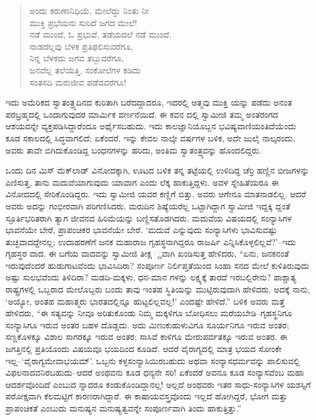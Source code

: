 \begin{verse}
ಅಂದು ಕರುಣಾನಿಧಿಯೆ, ಮೇಲೆದ್ದು ನಿಂತು ನೀ\\ಮುಕ್ತಿ ಪ್ರಭೆಯನು ಸುರಿದೆ ಜಗದ ಮೇಲೆ!\\ನಡೆ ಮುಂದೆ, ಓ ಪ್ರಭುವೆ, ತಡೆಯದಲೆ ನಡೆ ಮುಂದೆ,\\ನಾಡದೆಲ್ಲವು ಬೆಳಕ ಪ್ರತಿಫಲಿಸುವರೆಗೂ,\\ನಿನ್ನ ಬೆಳಕದು ಜಗವ ತಬ್ಬುವರೆಗೂ,\\ಜನವೆಲ್ಲ ತಲೆಯೆತ್ತಿ, ಸಂಕೋಲೆಗಳ ಕಡಿದು\\ಸಂತಸದಿ ಮರುಜೀವ ಪಡೆವವರೆಗೂ!
\end{verse}

ಇದು ಅಮೆರಿಕದ ಸ್ವಾತಂತ್ರ್ಯದಿನದ ಕುರಿತಾಗಿ ಬರೆದದ್ದಾದರೂ, ಇದರಲ್ಲಿ ಆತ್ಮವು ಮುಕ್ತಿ ಯನ್ನು ಪಡೆದು ಅನಂತ ಪರಬ್ರಹ್ಮದಲ್ಲಿ ಒಂದಾಗುವುದರ ಮಾರ್ಮಿಕ ವರ್ಣನೆಯಿದೆ. ಈ ಕವನ ದಲ್ಲಿ ಸ್ವಾಮೀಜಿ ತಮ್ಮ ಅಂತರಂಗದ ಆಶಯವನ್ನೇ ವ್ಯಕ್ತಪಡಿಸಿದ್ದಾರೆಂದೂ ಅರ್ಥೈಸಬಹುದು. ಇದು ಕಾಲಜ್ಞಾನಿಯೊಬ್ಬನ ಭವಿಷ್ಯವಾಣಿಯಂತಿದೆಯೆಂದು ಕೂಡ ಸಕಾಲದಲ್ಲಿ ಸಿದ್ಧವಾಗಲಿದೆ; ಏಕೆಂದರೆ, ಇನ್ನು ಕೇವಲ ನಾಲ್ಕೇ ವರ್ಷಗಳ ಬಳಿಕ, ಅದೇ ಜುಲೈ ನಾಲ್ಕರಂದು, ಅವರು ತಾವೇ ಬಿಗಿದುಕೊಂಡಿದ್ದ ಬಂಧನಗಳನ್ನು ಹರಿದು, ಅಂತಿಮ ಸ್ವಾತಂತ್ರ್ಯವನ್ನು ಹೊಂದಲಿದ್ದರು.

ಒಂದು ದಿನ ಮಿಸ್ ಮೆಕ್​ಲಾಡ್ ವಿನೋದಕ್ಕಾಗಿ, ಊಟದ ಬಳಿಕ ತನ್ನ ತಟ್ಟೆಯಲ್ಲಿ ಉಳಿದಿದ್ದ ಚೆರ್ರಿ ಹಣ್ಣಿನ ಬೀಜಗಳನ್ನು ಎಣಿಸುತ್ತ, ತಾನು ಮದುವೆಯಾಗುವುದು ಯಾವಾಗ ಎಂದು ಲೆಕ್ಕ ಹಾಕುತ್ತಿದ್ದಳು. ಅವಳ ಸ್ನೇಹಿತೆಯರೂ ಈ ವಿನೋದದಲ್ಲಿ ಸೇರಿಕೊಂಡಿದ್ದರು. ಇದು ಸ್ವಾಮೀಜಿ ಯವರ ಕಣ್ಣಿಗೆ ಬಿತ್ತು. ಅವರು ಆಗೇನೂ ಮಾತನಾಡಲಿಲ್ಲ. ಆದರೆ ಅವರು ಅದನ್ನು ಗಂಭೀರವಾಗಿ ಪರಿಗಣಿಸಿದರು. ಮರುದಿನ ಶಿಷ್ಯೆಯರೆಲ್ಲ ಒಟ್ಟಾಗಿದ್ದಾಗ ಸ್ವಾಮೀಜಿ ಇದ್ದಕ್ಕಿ ದ್ದಂತೆ ಸ್ಫೂರ್ತಿಭರಿತರಾಗಿ ತ್ಯಾಗ ಜೀವನದ ಹಿರಿಮೆಯನ್ನು ಬಣ್ಣಿಸತೊಡಗಿದರು. ಮದುವೆಯ ವಿಷಯದಲ್ಲಿ ಸಂನ್ಯಾಸಿಗಳ ಭಾವನೆಯೇ ಬೇರೆ, ಪ್ರಾಪಂಚಿಕರ ಭಾವನೆಯೇ ಬೇರೆ. ‘ಮದುವೆ ಎನ್ನುವುದು ಸಂನ್ಯಾಸಿಗಳು ಭಾವಿಸುವಷ್ಟು ತುಚ್ಛವಾದದ್ದೇನಲ್ಲ; ಉದಾಹರಣೆಗೆ ಜನಕ ಮಹಾರಾಜ ಗೃಹಸ್ಥನಾಗಿದ್ದರೂ ರಾಜರ್ಷಿ ಎನ್ನಿಸಿಕೊಳ್ಳಲಿಲ್ಲವೆ?’–ಇದು ಗೃಹಸ್ಥರ ವಾದ. ಈ ಬಗೆಯ ವಾದವನ್ನು ಸ್ವಾಮೀಜಿ ತೀಕ್ಷ ್ಣವಾಗಿ ಖಂಡಿಸುತ್ತ ಹೇಳಿದರು, “ಏನು, ಜನಕನಂತೆ ಇರುವುದೆಂದರೆ ಹುಡುಗಾಟವೆಂದು ಭಾವಿಸಿದಿರಾ? ಸಂಪೂರ್ಣ ನಿರ್ಲಿಪ್ತತೆಯಿಂದ ಸಿಂಹಾ ಸನದ ಮೇಲೆ ಕುಳಿತಿರುವುದು ಅಷ್ಟು ಸುಲಭವೆಂದು ತಿಳಿದಿರಾ? ಮಡದಿ-ಮಕ್ಕಳು, ಧನ-ಮಾನ ಗಳನ್ನು ಲಕ್ಷ್ಯಕ್ಕೆ ತಾರದೆ ಇರಬಲ್ಲಿರೇನು? ಪಾಶ್ಚಾತ್ಯ ರಾಷ್ಟ್ರಗಳಲ್ಲಿ ಒಬ್ಬರಾದ ಮೇಲೊಬ್ಬರು ಬಂದು ತಾವು ಇಂತಹ ಸ್ಥಿತಿಯನ್ನು ಮುಟ್ಟಿರುವುದಾಗಿ ಹೇಳಿದರು. ಅದಕ್ಕೆ ನಾನು, ‘ಅಯ್ಯೋ, ಅಂತಹ ಮಹಾತ್ಮರು ಭಾರತದಲ್ಲಿನ್ನೂ ಹುಟ್ಟಲಿಲ್ಲವಲ್ಲ!’ ಎಂದಷ್ಟೇ ಹೇಳಿದೆ.” ಬಳಿಕ ಅವರು ಮತ್ತೆ ಹೇಳಿದರು, “ಈ ಸತ್ಯವನ್ನು ನೀವೂ ಅರಿತುಕೊಂಡು ನಿಮ್ಮ ಮಕ್ಕಳಿಗೂ ಬೋಧಿಸಲು ಮರೆಯಬೇಡಿ–ಗೃಹಸ್ಥನಿಗೂ ಸಂನ್ಯಾಸಿಗೂ ಇರುವ ಅಂತರ ಬಹಳ ದೊಡ್ಡದು. ಅದು ಮಿಣುಕುಹುಳುವಿಗೂ ಸೂರ್ಯನಿಗೂ ಇರುವ ಅಂತರ; ಸಣ್ಣಕೊಳಕ್ಕೂ ವಿಶಾಲ ಸಾಗರಕ್ಕೂ ಇರುವ ಅಂತರ; ಸಾಸಿವೆ ಕಾಳಿಗೂ ಮೇರುಪರ್ವತಕ್ಕೂ ಇರುವ ಅಂತರ. ಈ ಜಗತ್ತಿನಲ್ಲಿ ಪ್ರತಿಯೊಂದು ವಿಷಯವೂ ಭಯದಿಂದ ಕೂಡಿದೆ. ಆದರೆ ವೈರಾಗ್ಯದಲ್ಲಿ ಮಾತ್ರ ಭಯದ ಸೋಂಕೇ ಇಲ್ಲ–‘ವೈರಾಗ್ಯಮೇವಾಭಯಮ್​’. ಒಬ್ಬನು ಕಳ್ಳಸಂನ್ಯಾಸಿಯಿರಬಹುದು ಅಥವಾ ಸಂನ್ಯಾಸಧರ್ಮವನ್ನು ಪಾಲಿಸುವಲ್ಲಿ ವಿಫಲನಾದವನಿರಬಹುದು–ಆದರೆ ಅಂಥವನು ಕೂಡ ಧನ್ಯನೇ ಸರಿ! ಏಕೆಂದರೆ ಅವನೂ ಕೂಡ ಸಂನ್ಯಾಸವೆಂಬ ಮಹಾ ಆದರ್ಶವೊಂದಿದೆ ಎಂಬುದ ನ್ನಾದರೂ ಕಂಡುಕೊಂಡಿದ್ದಾನಲ್ಲ! ಅಲ್ಲದೆ ಅಂಥವರು ಇತರ ಸಾಧು-ಸಂನ್ಯಾಸಿಗಳ ಯಶಸ್ಸಿಗೆ ಪರೋಕ್ಷವಾಗಿ ಕೆಲಮಟ್ಟಿಗೆ ಕಾರಣರಾಗಿದ್ದಾರೆ. ಈ ಕಾಷಾಯವಸ್ತ್ರವೊಂದು ಇಲ್ಲದೆ ಹೋಗಿದ್ದರೆ, ಭೋಗ ಮತ್ತು ಪ್ರಾಪಂಚಿಕತೆ ಎಂಬುದು ಮನುಷ್ಯನ ಮನುಷ್ಯತ್ವವನ್ನೇ ಸಂಪೂರ್ಣವಾಗಿ ತಿಂದು ಹಾಕುತ್ತಿತ್ತು.”

